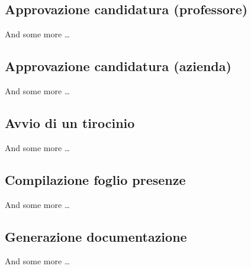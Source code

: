 \subsection{Approvazione candidatura (professore)}
And some more \dots

\subsection{Approvazione candidatura (azienda)}
And some more \dots

\subsection{Avvio di un tirocinio}
And some more \dots

\subsection{Compilazione foglio presenze}
And some more \dots

\subsection{Generazione documentazione}
And some more \dots